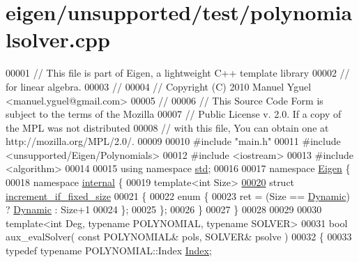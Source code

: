 \hypertarget{eigen_2unsupported_2test_2polynomialsolver_8cpp_source}{}\section{eigen/unsupported/test/polynomialsolver.cpp}
\label{eigen_2unsupported_2test_2polynomialsolver_8cpp_source}

\begin{DoxyCode}
00001 \textcolor{comment}{// This file is part of Eigen, a lightweight C++ template library}
00002 \textcolor{comment}{// for linear algebra.}
00003 \textcolor{comment}{//}
00004 \textcolor{comment}{// Copyright (C) 2010 Manuel Yguel <manuel.yguel@gmail.com>}
00005 \textcolor{comment}{//}
00006 \textcolor{comment}{// This Source Code Form is subject to the terms of the Mozilla}
00007 \textcolor{comment}{// Public License v. 2.0. If a copy of the MPL was not distributed}
00008 \textcolor{comment}{// with this file, You can obtain one at http://mozilla.org/MPL/2.0/.}
00009 
00010 \textcolor{preprocessor}{#include "main.h"}
00011 \textcolor{preprocessor}{#include <unsupported/Eigen/Polynomials>}
00012 \textcolor{preprocessor}{#include <iostream>}
00013 \textcolor{preprocessor}{#include <algorithm>}
00014 
00015 \textcolor{keyword}{using namespace }\hyperlink{namespacestd}{std};
00016 
00017 \textcolor{keyword}{namespace }\hyperlink{namespace_eigen}{Eigen} \{
00018 \textcolor{keyword}{namespace }\hyperlink{namespaceinternal}{internal} \{
00019 \textcolor{keyword}{template}<\textcolor{keywordtype}{int} Size>
\hyperlink{struct_eigen_1_1internal_1_1increment__if__fixed__size}{00020} \textcolor{keyword}{struct }\hyperlink{struct_eigen_1_1internal_1_1increment__if__fixed__size}{increment\_if\_fixed\_size}
00021 \{
00022   \textcolor{keyword}{enum} \{
00023     ret = (Size == \hyperlink{namespace_eigen_ad81fa7195215a0ce30017dfac309f0b2}{Dynamic}) ? \hyperlink{namespace_eigen_ad81fa7195215a0ce30017dfac309f0b2}{Dynamic} : Size+1
00024   \};
00025 \};
00026 \}
00027 \}
00028 
00029 
00030 \textcolor{keyword}{template}<\textcolor{keywordtype}{int} Deg, \textcolor{keyword}{typename} POLYNOMIAL, \textcolor{keyword}{typename} SOLVER>
00031 \textcolor{keywordtype}{bool} aux\_evalSolver( \textcolor{keyword}{const} POLYNOMIAL& pols, SOLVER& psolve )
00032 \{
00033   \textcolor{keyword}{typedef} \textcolor{keyword}{typename} POLYNOMIAL::Index \hyperlink{namespace_eigen_a62e77e0933482dafde8fe197d9a2cfde}{Index};

\end{DoxyCode}
